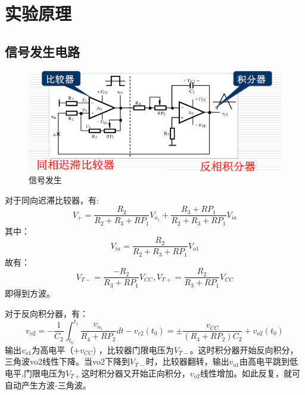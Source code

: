 \documentclass[a4paper]{article}
\theoremstyle{definition}
\theoremstyle{plain}
\theoremstyle{remark}
\begin{document}
\section{实验原理}
\subsection{信号发生电路}
\begin{figure}[H]
	\centering
	\includegraphics[width=1\textwidth]{信号发生}
	\caption{信号发生}
	\label{信号发生}
\end{figure}
对于同向迟滞比较器，有:
\begin{equation}
	V_+ = \frac{R_2}{R_2+R_3+RP_1}V_{o_1}+\frac{R_3+RP_1}{R_2+R_3+RP_1}V_{ia}
\end{equation}
其中：
\begin{equation}
	V_{ia} = \frac{R_2}{R_2+R_3+RP_1}V_{o1}
\end{equation}
故有：
\begin{equation}
	V_{T-} = \frac{-R_2}{R_3+RP_1}V_{CC},V_{T+}=\frac{R_2}{R_3+RP_1}V_{CC}
\end{equation}
即得到方波。

对于反向积分器，有：
\begin{equation}
	v_{o2}=-\frac{1}{C_2}\int_{t_0}^{t_1} \frac{v_{o_1}}{R_4+RP_2}dt-v_{c2}(t_0)=\pm \frac{v_{CC}}{(R_4+RP_2)C_2}+v_{o2}(t_0)
\end{equation}
输出$v_{o1}$为高电平（$+v_{CC}$) ，比较器门限电压为$V_{T-}$。这时积分器开始反向积分，三角波vo2线性下降。当vo2下降到$V_{T-}$时，比较器翻转，输出$v_{o1}$由高电平跳到低电平,门限电压为$V_{T+}$这时积分器又开始正向积分，$v_{o2}$线性增加。如此反复，就可自动产生方波-三角波。
\end{document}
